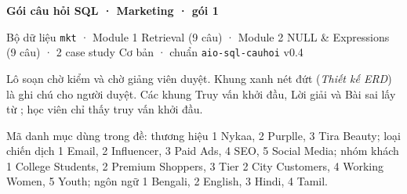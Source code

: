 \documentclass[11pt,a4paper]{article}
\begin{document}
{\LARGE\bfseries Gói câu hỏi SQL · Marketing · gói 1\par}
\medskip
{\color{cqMuted}Bộ dữ liệu \texttt{mkt} · Module 1 Retrieval (9 câu) · Module 2 NULL \& Expressions (9 câu) · 2 case study Cơ bản · chuẩn \texttt{aio-sql-cauhoi} v0.4\par}
\bigskip
Lô soạn chờ kiểm và chờ giảng viên duyệt. Khung xanh nét đứt (\emph{Thiết kế ERD}) là ghi chú cho người duyệt. Các khung Truy vấn khởi đầu, Lời giải và Bài sai lấy từ ; học viên chỉ thấy truy vấn khởi đầu.

Mã danh mục dùng trong đề: thương hiệu  1 Nykaa, 2 Purplle, 3 Tira Beauty; loại chiến dịch  1 Email, 2 Influencer, 3 Paid Ads, 4 SEO, 5 Social Media; nhóm khách  1 College Students, 2 Premium Shoppers, 3 Tier 2 City Customers, 4 Working Women, 5 Youth; ngôn ngữ  1 Bengali, 2 English, 3 Hindi, 4 Tamil.

\tableofcontents


\end{document}

